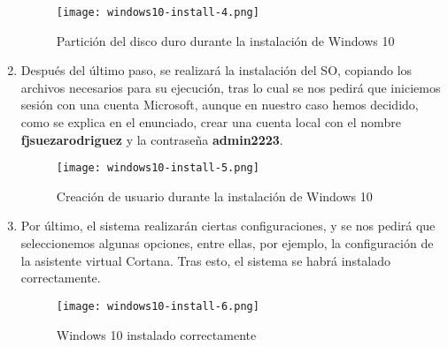 \begin{enumerate}
    \begin{figure}[H]
        \centering
        \texttt{[image: windows10-install-4.png]}
        \caption{Partición del disco duro durante la instalación de Windows 10}
    \end{figure}

    \item Después del último paso, se realizará la instalación del SO, copiando los archivos necesarios para su ejecución, tras lo cual se nos pedirá que iniciemos sesión con una cuenta Microsoft, aunque en nuestro caso hemos decidido, como se explica en el enunciado, crear una cuenta local con el nombre \textbf{fjsuezarodriguez} y la contraseña \textbf{admin2223}.

    \begin{figure}[H]
        \centering
        \texttt{[image: windows10-install-5.png]}
        \caption{Creación de usuario durante la instalación de Windows 10}
    \end{figure}

    \item Por último, el sistema realizarán ciertas configuraciones, y se nos pedirá que seleccionemos algunas opciones, entre ellas, por ejemplo, la configuración de la asistente virtual Cortana. Tras esto, el sistema se habrá instalado correctamente.

    \begin{figure}[H]
        \centering
        \texttt{[image: windows10-install-6.png]}
        \caption{Windows 10 instalado correctamente}
    \end{figure}
\end{enumerate}



\newpage



